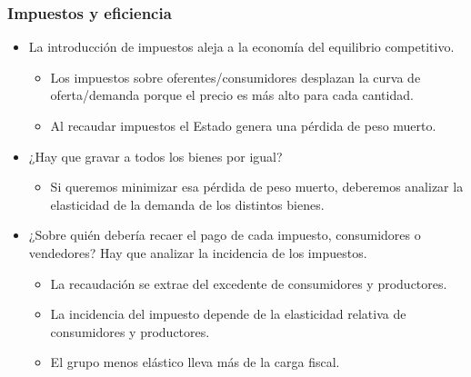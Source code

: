 \documentclass{beamer}
\begin{document}
\begin{frame}
\frametitle{Impuestos y eficiencia}
\begin{itemize}
    \item La introducción de impuestos aleja a la economía del equilibrio competitivo. 
    \begin{itemize}
        \item Los impuestos sobre oferentes/consumidores desplazan la curva de oferta/demanda porque el precio es más alto para cada cantidad.
        \item Al recaudar impuestos el Estado genera una pérdida de peso muerto. 
    \end{itemize}
    \vspace{1mm}
    \item ¿Hay que gravar a todos los bienes por igual?
        \begin{itemize}
        \item Si queremos minimizar esa pérdida de peso muerto, deberemos analizar la elasticidad de la demanda de los distintos bienes.
    \vspace{1mm}
    \end{itemize}
    \item  ¿Sobre quién debería recaer el pago de cada impuesto, consumidores o vendedores? Hay que analizar la incidencia de los impuestos.
    \begin{itemize}
        \item La recaudación se extrae del excedente de consumidores y productores.
        \item La incidencia del impuesto depende de la elasticidad relativa de consumidores y productores.
        \item El grupo menos elástico lleva más de la carga fiscal. 
    \end{itemize}
\end{itemize}
\end{frame}
\end{document}
